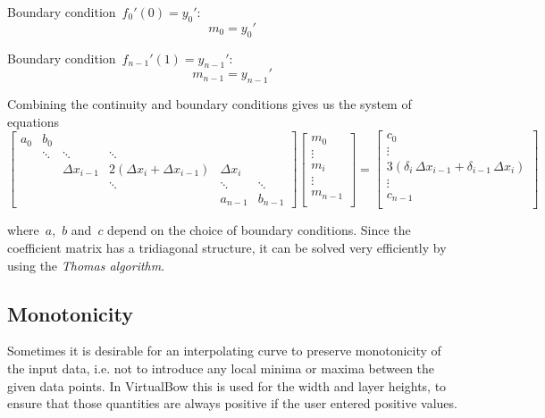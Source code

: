 Boundary condition~$f_{0}'(0) = y_{0}'$:
%
\begin{equation}
m_{0} = y_{0}'
\end{equation}

Boundary condition~$f_{n-1}'(1) = y_{n-1}'$:
%
\begin{equation}
m_{n-1} = y_{n-1}'
\end{equation}

Combining the continuity and boundary conditions gives us the system of equations
%
\begin{equation}
\begin{bmatrix}
a_{0} & b_{0} \\
& \ddots & \ddots & \ddots \\
&& \Delta x_{i-1} & 2(\Delta x_{i} + \Delta x_{i-1}) & \Delta x_{i} \\
&&& \ddots & \ddots & \ddots \\
&&&& a_{n-1} & b_{n-1}
\end{bmatrix}
\begin{bmatrix}
m_{0} \\
\vdots \\
m_{i} \\
\vdots \\
m_{n-1} \\
\end{bmatrix}
=
\begin{bmatrix}
c_{0} \\
\vdots \\
3\left(\delta_{i}\,\Delta x_{i-1} + \delta_{i-1}\,\Delta x_{i}\right) \\
\vdots \\
c_{n-1} \\
\end{bmatrix}
\end{equation}

where~$a$,~$b$ and~$c$ depend on the choice of boundary conditions. Since the coefficient matrix has a tridiagonal structure, it can be solved very efficiently by using the \textit{Thomas algorithm}.

\subsection{Monotonicity}

Sometimes it is desirable for an interpolating curve to preserve monotonicity of the input data, i.e. not to introduce any local minima or maxima between the given data points.
In VirtualBow this is used for the width and layer heights, to ensure that those quantities are always positive if the user entered positive values.


